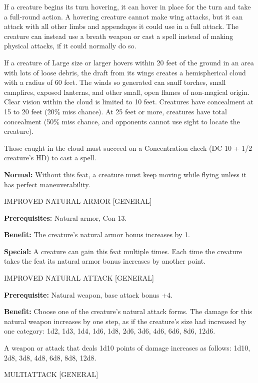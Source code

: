 \documentclass{article}
\begin{document}
If a creature begins its turn hovering, it can hover in place for the turn and 
take a full-round action. A hovering creature cannot make wing attacks, but it 
can attack with all other limbs and appendages it could use in a full attack. The 
creature can instead use a breath weapon or cast a spell instead of making physical 
attacks, if it could normally do so.

If a creature of Large size or larger hovers within 20 feet of the ground in an 
area with lots of loose debris, the draft from its wings creates a hemispherical 
cloud with a radius of 60 feet. The winds so generated can snuff torches, small 
campfires, exposed lanterns, and other small, open flames of non-magical origin. 
Clear vision within the cloud is limited to 10 feet. Creatures have concealment 
at 15 to 20 feet (20\% miss chance). At 25 feet or more, creatures have total concealment 
(50\% miss chance, and opponents cannot use sight to locate the creature).

Those caught in the cloud must succeed on a Concentration check (DC 10 + 1/2 creature's 
HD) to cast a spell.

\textbf{Normal: }Without this feat, a creature must keep moving while flying unless 
it has perfect maneuverability.

\vspace{12pt}
IMPROVED NATURAL ARMOR  [GENERAL]

\textbf{Prerequisites:} Natural armor, Con 13.

\textbf{Benefit:} The creature's natural armor bonus increases by 1.

\textbf{Special:} A creature can gain this feat multiple times. Each time the creature 
takes the feat its natural armor bonus increases by another point.

\vspace{12pt}
IMPROVED NATURAL ATTACK  [GENERAL]

\textbf{Prerequisite:} Natural weapon, base attack bonus +4.

\textbf{Benefit:} Choose one of the creature's natural attack forms. The damage 
for this natural weapon increases by one step, as if the creature's size had increased 
by one category: 1d2, 1d3, 1d4, 1d6, 1d8, 2d6, 3d6, 4d6, 6d6, 8d6, 12d6. 

A weapon or attack that deals 1d10 points of damage increases as follows: 1d10, 
2d8, 3d8, 4d8, 6d8, 8d8, 12d8.

\vspace{12pt}
MULTIATTACK  [GENERAL]
\end{document}
